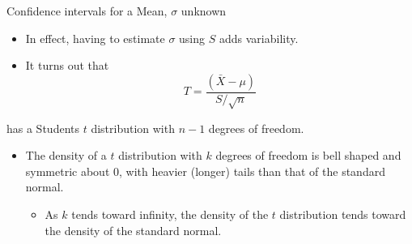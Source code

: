 \documentclass[
  ignorenonframetext,
]{beamer}
\providecommand{\tightlist}{%
  \setlength{\itemsep}{0pt}\setlength{\parskip}{0pt}}
\begin{document}
\begin{frame}{Confidence intervals for a Mean, \(\sigma\) unknown}
\label{confidence-intervals-for-a-mean-sigma-unknown-3}
\begin{itemize}
\item
  In effect, having to estimate \(\sigma\) using \(S\) adds variability.
\item
  It turns out that \[T=\frac{(\bar{X}-\mu)}{S/\sqrt{n}}\]
\end{itemize}

has a Students \(t\) distribution with \(n-1\) degrees of freedom.

\begin{itemize}
\item
  The density of a \(t\) distribution with \(k\) degrees of freedom is
  bell shaped and symmetric about 0, with heavier (longer) tails than
  that of the standard normal.

  \begin{itemize}
  \tightlist
  \item
    As \(k\) tends toward infinity, the density of the \(t\)
    distribution tends toward the density of the standard normal.
  \end{itemize}
\end{itemize}
\end{frame}
\end{document}
